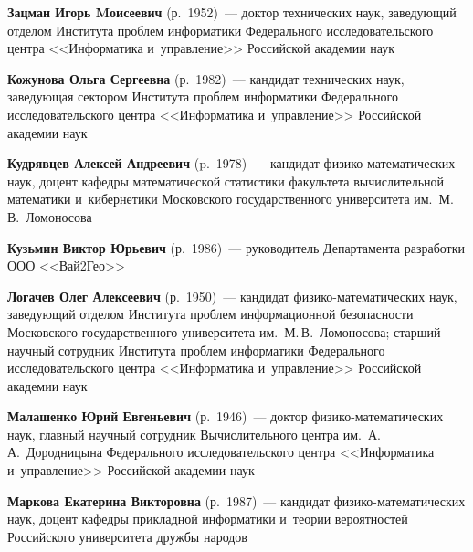 \begin{multicols}{2}
\noindent
\textbf{Зацман Игорь Mоисеевич} (р.\ 1952)~--- 
доктор тех\-нических наук, заведующий отделом Института проб\-лем 
информатики Федерального исследовательского центра <<Информатика и~управ\-ле\-ние>>
Российской академии наук

\vspace*{6pt}

\noindent
\textbf{Кожунова Ольга Сергеевна} (р.\ 1982)~--- 
кандидат технических наук, заведующая сектором Института проб\-лем 
информатики Федерального исследовательского центра <<Информатика и~управ\-ле\-ние>>
Российской академии наук

\vspace*{6pt}




\noindent
\textbf{Кудрявцев Алексей Андреевич} (p.\ 1978)~--- 
кандидат фи\-зи\-ко-ма\-те\-ма\-ти\-че\-ских наук, 
доцент кафедры математической статистики факультета вычислительной математики 
и~кибернетики Московского государственного университета им.\ М.\,В.~Ломоносова

\vspace*{6pt}

\def\leftkol{ОБ АВТОРАХ}
\def\rightkol{ОБ АВТОРАХ}


\noindent
\textbf{Кузьмин Виктор Юрьевич} (р.\ 1986)~--- руководитель Департамента 
разработки ООО <<Вай2Гео>>

\vspace*{6pt}

\noindent
\textbf{Логачев Олег Алексеевич} (р.\ 1950)~--- 
кандидат фи\-зи\-ко-ма\-те\-ма\-ти\-че\-ских наук, заведующий 
отделом Института проблем информационной без\-опас\-ности 
Московского государственного университета им.\ М.\,В.~Ломоносова; 
старший научный сотрудник Института проблем информатики Федерального 
исследовательского центра <<Информатика и~управ\-ле\-ние>> Российской академии наук

\vspace*{6pt}

\noindent
\textbf{Малашенко Юрий Евгеньевич} (р.\ 1946)~--- доктор 
фи\-зи\-ко-ма\-те\-ма\-ти\-че\-ских наук, главный научный со\-труд\-ник 
Вычислительного центра им.\ А.\,А.~Дородницына Федерального исследовательского центра 
<<Информатика и~управ\-ле\-ние>> Российской академии наук 

\vspace*{6pt}

\noindent
\textbf{Маркова Екатерина Викторовна} (р.\ 1987)~--- 
кандидат фи\-зи\-ко-ма\-те\-ма\-ти\-че\-ских наук, доцент кафедры прикладной 
информатики и~тео\-рии вероятностей Российского университета дружбы народов


\end{multicols}

